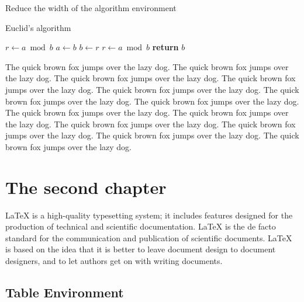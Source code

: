 \documentclass[openany,twoside,12pt]{book}
\theoremstyle{plain}
\numberwithin{equation}{chapter}
\numberwithin{figure}{chapter}
\numberwithin{table}{chapter}
\begin{document}
\clearpage
Reduce the width of the algorithm environment
\begin{center}
\vspace{-2ex}
\begin{minipage}{0.9\linewidth}
\begin{algorithm}[H]
\caption{Euclid’s algorithm}
\label{euclid}
\begin{algorithmic} %
     
        \State $r\gets a \bmod b$
         
            \State $a \gets b$
            \State $b \gets r$
            \State $r \gets a \bmod b$
        \EndWhile\label{euclidendwhile}
            \State \textbf{return} $b$
    \EndProcedure
\end{algorithmic}
\end{algorithm}
\end{minipage}
\end{center}


The quick brown fox jumps over the lazy dog. The quick brown fox jumps over the lazy dog. The quick brown fox jumps over the lazy dog. The quick brown fox jumps over the lazy dog. The quick brown fox jumps over the lazy dog. The quick brown fox jumps over the lazy dog. The quick brown fox jumps over the lazy dog. The quick brown fox jumps over the lazy dog. The quick brown fox jumps over the lazy dog. The quick brown fox jumps over the lazy dog. The quick brown fox jumps over the lazy dog. The quick brown fox jumps over the lazy dog. The quick brown fox jumps over the lazy dog.


\chapter{The second chapter}

LaTeX is a high-quality typesetting system; it includes features designed
for the production of technical and scientific documentation.
LaTeX is the de facto standard for the communication and publication of scientific documents.
LaTeX is based on the idea that it is better to leave document design to
document designers, and to let authors get on with writing documents.

\section{Table Environment}
\end{document}
